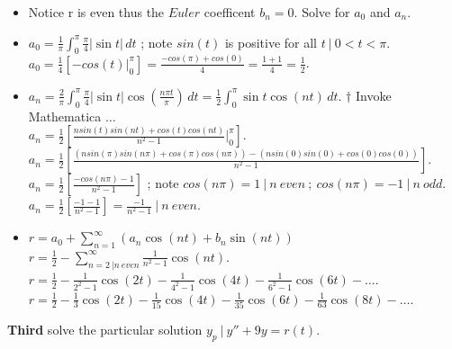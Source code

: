 \documentclass[10pt]{article}
\begin{document}
\begin{itemize}
    \item Notice r is even thus the $ Euler $ coefficent $ b_n = 0 $. Solve for $ a_0 $ and $ a_n $. \\
    \item $ \displaystyle a_0 = \frac{1}{\pi}  \int_{0}^{\pi} \frac{\pi}{4} |\sin{t}| \,dt $ ; note $ sin(t) $ is positive for all $ t \ | \ 0 < t < \pi $. \\
    \subitem $ \displaystyle a_0 = \frac{1}{4} [- cos(t) \Big|_{0}^{\pi}] = \frac{- cos(\pi) + cos(0)}{4} = \frac{1 + 1}{4} = \frac{1}{2} $. 
    \item $ \displaystyle a_n = \frac{2}{\pi}  \int_{0}^{\pi} \frac{\pi}{4} |\sin{t}| \cos(\frac{n\pi t}{\pi}) \,dt = \frac{1}{2}  \int_{0}^{\pi} \sin{t} \cos(nt) \,dt $. $ \dagger $ Invoke Mathematica $ \dots $ \\
    \subitem $ \displaystyle a_n = \frac{1}{2} [\frac{nsin(t)sin(nt) + cos(t)cos(nt)}{n^2 - 1} \Big|_{0}^{\pi}] $.
    \subitem $ \displaystyle a_n = \frac{1}{2} [\frac{(nsin(\pi)sin(n\pi) + cos(\pi)cos(n\pi)) - (nsin(0)sin(0) + cos(0)cos(0))}{n^2 - 1}] $. \\ 
    \subitem $ \displaystyle a_n = \frac{1}{2} [\frac{- cos(n\pi) - 1}{n^2 - 1}] $ ; note $ cos(n\pi) = 1 \ | \ n \ even \ ; \ cos(n\pi) = -1 \ | \ n \ odd $.
    \subitem $ \displaystyle a_n = \frac{1}{2} [\frac{- 1 - 1}{n^2 - 1}] = \frac{- 1}{n^2 - 1} \ | \ n \ even $. 
    \item $ \displaystyle r = a_0 + \sum_{n = 1}^{\infty} (a_n \cos(nt) + b_n \sin (nt)) $ \\
    \subitem $ \displaystyle r = \frac{1}{2} - \sum_{n = 2 \ | n \ even}^{\infty} \frac{1}{n^2 - 1} \cos(nt) $.
    \subitem $ \displaystyle r = \frac{1}{2} - \frac{1}{2^2 - 1} \cos(2t)  - \frac{1}{4^2 - 1} \cos(4t)  - \frac{1}{6^2 - 1} \cos(6t) - \dots $.
    \subitem $ \displaystyle r = \frac{1}{2} - \frac{1}{3} \cos(2t)  - \frac{1}{15} \cos(4t)  - \frac{1}{35} \cos(6t) - \frac{1}{63} \cos(8t) - \dots $. \\
\end{itemize} 
\newpage

\noindent
\textbf{Third} solve the particular solution $ y_p \ | \ y'' + 9y = r(t) $. \\
\end{document}
